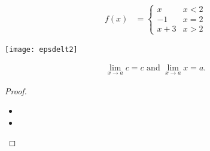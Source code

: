 \begin{ex}
\begin{align*}
f(x) &= \begin{cases}
x & x<2 \\
-1 & x=2 \\
x+3 & x>2
\end{cases}
\end{align*}
\begin{efig}
\begin{center}
\texttt{[image: epsdelt2]}
\end{center}
\end{efig}
\end{ex}
\begin{align*}
\lim_{x \to a} c = c \text{ and } \lim_{x \to a} x = a.
\end{align*}
\begin{proof}%
\begin{itemize}
\item %
\item %
\end{itemize}
\end{proof}

